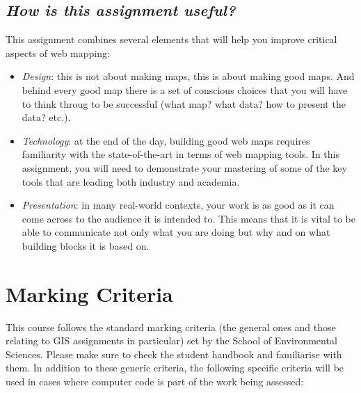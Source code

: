 \documentclass[
  letterpaper,
  DIV=11,
  numbers=noendperiod]{scrreprt}
\begin{document}
\subsection*{\texorpdfstring{\emph{How is this assignment
useful?}}{How is this assignment useful?}}\label{how-is-this-assignment-useful-1}

This assignment combines several elements that will help you improve
critical aspects of web mapping:

\begin{itemize}
\item
  \emph{Design}: this is not about making maps, this is about making
  good maps. And behind every good map there is a set of conscious
  choices that you will have to think throug to be successful (what map?
  what data? how to present the data? etc.).
\item
  \emph{Technology}: at the end of the day, building good web maps
  requires familiarity with the state-of-the-art in terms of web mapping
  tools. In this assignment, you will need to demonstrate your mastering
  of some of the key tools that are leading both industry and academia.
\item
  \emph{Presentation}: in many real-world contexts, your work is as good
  as it can come across to the audience it is intended to. This means
  that it is vital to be able to communicate not only what you are doing
  but why and on what building blocks it is based on.
\end{itemize}

\section*{Marking Criteria}\label{marking-criteria}


This course follows the standard marking criteria (the general ones and
those relating to GIS assignments in particular) set by the School of
Environmental Sciences. Please make sure to check the student handbook
and familiarise with them. In addition to these generic criteria, the
following specific criteria will be used in cases where computer code is
part of the work being assessed:
\end{document}
